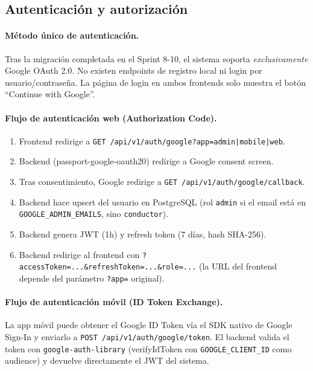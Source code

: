 \documentclass[12pt,a4paper,oneside]{article}
\begin{document}
\subsection{Autenticaci\'on y autorizaci\'on}

\paragraph{M\'etodo \'unico de autenticaci\'on.} Tras la migraci\'on completada en el Sprint 8-10, el sistema soporta \emph{exclusivamente} Google OAuth 2.0. No existen endpoints de registro local ni login por usuario/contrase\~na. La p\'agina de login en ambos frontends solo muestra el bot\'on ``Continue with Google''.

\paragraph{Flujo de autenticaci\'on web (Authorization Code).}
\begin{enumerate}[leftmargin=*]
  \item Frontend redirige a \texttt{GET /api/v1/auth/google?app=admin|mobile|web}.
  \item Backend (passport-google-oauth20) redirige a Google consent screen.
  \item Tras consentimiento, Google redirige a \texttt{GET /api/v1/auth/google/callback}.
  \item Backend hace upsert del usuario en PostgreSQL (rol \texttt{admin} si el email est\'a en \texttt{GOOGLE\_ADMIN\_EMAILS}, sino \texttt{conductor}).
  \item Backend genera JWT (1h) y refresh token (7 d\'ias, hash SHA-256).
  \item Backend redirige al frontend con \texttt{?accessToken=...\&refreshToken=...\&role=...} (la URL del frontend depende del par\'ametro \texttt{?app=} original).
\end{enumerate}

\paragraph{Flujo de autenticaci\'on m\'ovil (ID Token Exchange).}
La app m\'ovil puede obtener el Google ID Token v\'ia el SDK nativo de Google Sign-In y enviarlo a \texttt{POST /api/v1/auth/google/token}. El backend valida el token con \texttt{google-auth-library} (verifyIdToken con \texttt{GOOGLE\_CLIENT\_ID} como audience) y devuelve directamente el JWT del sistema.
\end{document}
